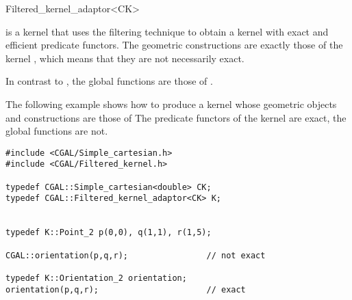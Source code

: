 \begin{ccRefClass}{Filtered_kernel_adaptor<CK>}

\KernelRefLayout\gdef\ccTagOperatorLayout{\ccFalse}

\ccDefinition

\ccClassTemplateName is a kernel that uses the filtering technique
\cite{cgal:bbp-iayed-01} to obtain a kernel with exact and efficient
predicate functors.
The geometric constructions are exactly those
of the kernel , which means that they are not necessarily exact.

In contrast to , 
the global functions are those of .

\ccIsModel
{}


\ccExample

The following example shows how to produce a kernel whose geometric
objects and constructions are those of 
The predicate functors of the kernel are exact, the global functions
are not.

\begin{verbatim}
#include <CGAL/Simple_cartesian.h>
#include <CGAL/Filtered_kernel.h>

typedef CGAL::Simple_cartesian<double> CK;
typedef CGAL::Filtered_kernel_adaptor<CK> K;


typedef K::Point_2 p(0,0), q(1,1), r(1,5);

CGAL::orientation(p,q,r);                // not exact

typedef K::Orientation_2 orientation;
orientation(p,q,r);                      // exact

\end{verbatim}


\end{ccRefClass}
